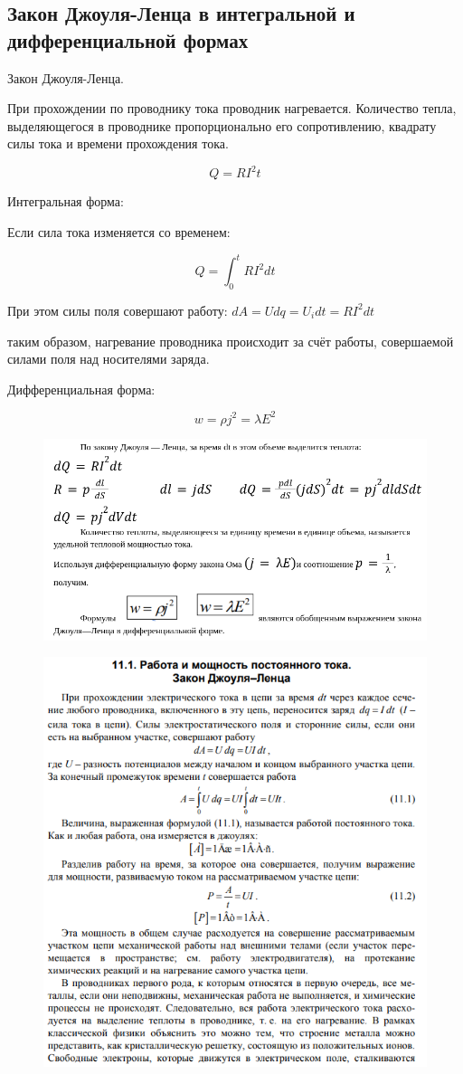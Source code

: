 \subsection{Закон Джоуля-Ленца в интегральной и дифференциальной формах}

\begin{definition}
    Закон Джоуля-Ленца.

    При прохождении по проводнику тока проводник нагревается. Количество тепла, выделяющегося в проводнике пропорционально его сопротивлению, квадрату силы тока и времени прохождения тока.

    $$
    Q=RI^2t
    $$
\end{definition}

\begin{definition}
    Интегральная форма:

    Если сила тока изменяется со временем:

    $$
    Q=\int_0^tRI^2dt
    $$
\end{definition}

При этом силы поля совершают работу:
$\displaystyle dA=Udq=U_idt=RI^2dt$

таким образом, нагревание проводника происходит за счёт работы, совершаемой силами поля над носителями заряда.

\begin{definition}
    Дифференциальная форма:

    $$
    w=\rho j^2=\lambda E^2
    $$
\end{definition}

\begin{figure}[h]
    \centering
    \includegraphics[width=0.7\linewidth]{imgs/q31i1.png}
\end{figure}

\begin{figure}[h]
    \centering
    \includegraphics[width=0.5\linewidth]{imgs/q31i2.png}
\end{figure}

